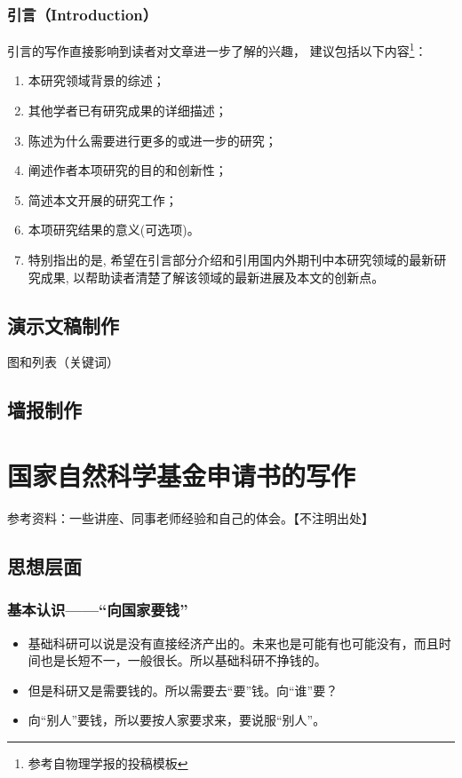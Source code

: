 \subsection{引言（Introduction）}
引言的写作直接影响到读者对文章进一步了解的兴趣， 建议包括以下内容\footnote{参考自物理学报的投稿模板}：
\begin{enumerate}
\item 本研究领域背景的综述；
\item 其他学者已有研究成果的详细描述；
\item 陈述为什么需要进行更多的或进一步的研究；
\item 阐述作者本项研究的目的和创新性；
\item 简述本文开展的研究工作；
\item 本项研究结果的意义(可选项)。
\item 特别指出的是, 希望在引言部分介绍和引用国内外期刊中本研究领域的最新研究成果, 以帮助读者清楚了解该领域的最新进展及本文的创新点。
\end{enumerate}



\section{演示文稿制作}
图和列表（关键词）



\section{墙报制作}








\chapter{国家自然科学基金申请书的写作}
参考资料：一些讲座、同事老师经验和自己的体会。【不注明出处】
\section{思想层面}
\subsection{基本认识——“向国家要钱”}
\begin{itemize}
\item 基础科研可以说是没有直接经济产出的。未来也是可能有也可能没有，而且时间也是长短不一，一般很长。所以基础科研不挣钱的。
\item 但是科研又是需要钱的。所以需要去“要”钱。向“谁”要？
\item 向“别人”要钱，所以要按人家要求来，要说服“别人”。
\end{itemize}


